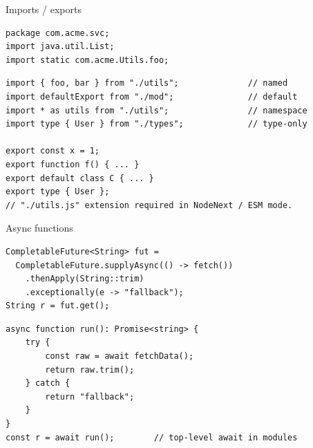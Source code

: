 \documentclass[10pt]{article}
\begin{document}
\begin{construct}{Imports / exports}
\noindent
\begin{minipage}[t]{0.485\linewidth}
\begin{lstlisting}[style=java, title=Java]
package com.acme.svc;
import java.util.List;
import static com.acme.Utils.foo;
\end{lstlisting}
\end{minipage}\hfill
\begin{minipage}[t]{0.485\linewidth}
\begin{lstlisting}[style=ts, title=TypeScript]
import { foo, bar } from "./utils";              // named
import defaultExport from "./mod";               // default
import * as utils from "./utils";                // namespace
import type { User } from "./types";             // type-only

export const x = 1;
export function f() { ... }
export default class C { ... }
export type { User };
// "./utils.js" extension required in NodeNext / ESM mode.
\end{lstlisting}
\end{minipage}
\end{construct}


\begin{construct}{Async functions}
\noindent
\begin{minipage}[t]{0.485\linewidth}
\begin{lstlisting}[style=java, title=Java]
CompletableFuture<String> fut =
  CompletableFuture.supplyAsync(() -> fetch())
    .thenApply(String::trim)
    .exceptionally(e -> "fallback");
String r = fut.get();
\end{lstlisting}
\end{minipage}\hfill
\begin{minipage}[t]{0.485\linewidth}
\begin{lstlisting}[style=ts, title=TypeScript]
async function run(): Promise<string> {
    try {
        const raw = await fetchData();
        return raw.trim();
    } catch {
        return "fallback";
    }
}
const r = await run();        // top-level await in modules
\end{lstlisting}
\end{minipage}
\end{construct}
\end{document}
